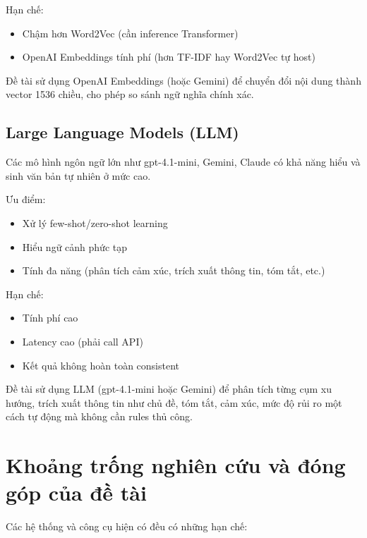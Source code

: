 Hạn chế:
\begin{itemize}
    \item Chậm hơn Word2Vec (cần inference Transformer)
    \item OpenAI Embeddings tính phí (hơn TF-IDF hay Word2Vec tự host)
\end{itemize}

Đề tài sử dụng OpenAI Embeddings (hoặc Gemini) để chuyển đổi nội dung thành vector 1536 chiều, cho phép so sánh ngữ nghĩa chính xác.

\subsection{Large Language Models (LLM)}

Các mô hình ngôn ngữ lớn như gpt-4.1-mini, Gemini, Claude có khả năng hiểu và sinh văn bản tự nhiên ở mức cao.

Ưu điểm:
\begin{itemize}
    \item Xử lý few-shot/zero-shot learning
    \item Hiểu ngữ cảnh phức tạp
    \item Tính đa năng (phân tích cảm xúc, trích xuất thông tin, tóm tắt, etc.)
\end{itemize}

Hạn chế:
\begin{itemize}
    \item Tính phí cao
    \item Latency cao (phải call API)
    \item Kết quả không hoàn toàn consistent
\end{itemize}

Đề tài sử dụng LLM (gpt-4.1-mini hoặc Gemini) để phân tích từng cụm xu hướng, trích xuất thông tin như chủ đề, tóm tắt, cảm xúc, mức độ rủi ro một cách tự động mà không cần rules thủ công.

\section{Khoảng trống nghiên cứu và đóng góp của đề tài}

Các hệ thống và công cụ hiện có đều có những hạn chế:

